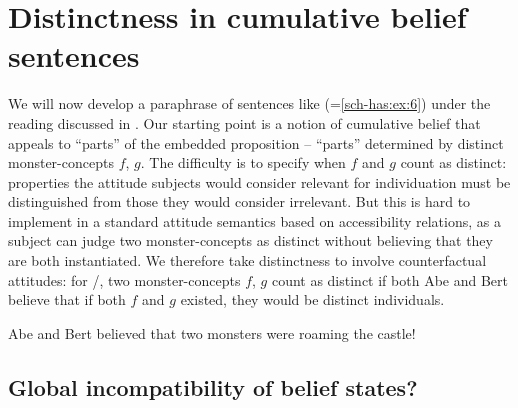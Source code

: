 \documentclass[output=paper]{langscibook}
\begin{document}
\section{Distinctness in cumulative belief sentences}\label{sch-has:sec:3}

We will now develop a paraphrase of sentences like  (=\ref{sch-has:ex:6}) under the reading discussed in . Our starting point is a notion of cumulative belief that appeals to ``parts'' of the embedded proposition -- ``parts'' determined by distinct monster-concepts $f$, $g$. The difficulty is to specify when $f$ and $g$ count as distinct: properties the attitude subjects would consider relevant for individuation must be distinguished from those they would consider irrelevant. But this is hard to implement in a standard attitude semantics based on accessibility relations, as a subject can judge two monster-concepts as distinct without believing that they are both instantiated. We therefore take distinctness to involve counterfactual attitudes: for /, two monster-concepts $f$, $g$ count as distinct if both Abe and Bert believe that if both $f$ and $g$ existed, they would be distinct individuals.

\ea \label{sch-has:ex:19} Abe and Bert  believed that two monsters were roaming the castle! \z  %


\subsection{Global incompatibility of belief states?}\label{sch-has:sec:3.1}
\end{document}
